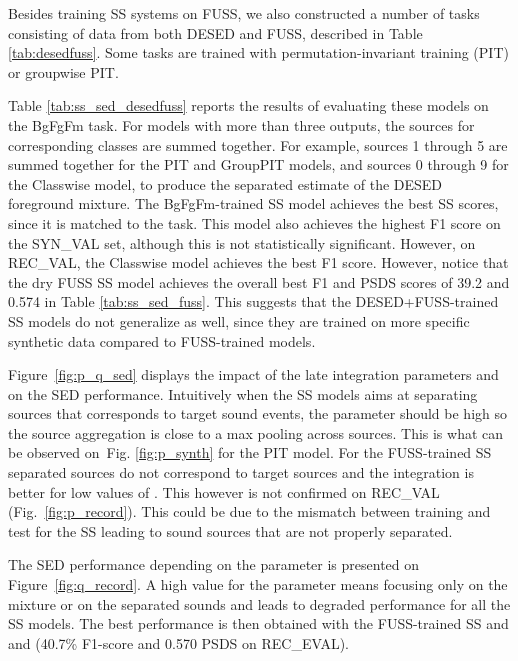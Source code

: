 \documentclass{article}
\begin{document}
\begin{sloppy}
Besides training SS systems on FUSS, we also constructed a number of tasks consisting of data from both DESED and FUSS, described in Table \ref{tab:desedfuss}. Some tasks are trained with permutation-invariant training (PIT) \cite{yu2017permutation} or groupwise PIT.



Table \ref{tab:ss_sed_desedfuss} reports the results of evaluating these models on the BgFgFm task. For models with more than three outputs, the sources for corresponding classes are summed together. For example, sources 1 through 5 are summed together for the PIT and GroupPIT models, and sources 0 through 9 for the Classwise model, to produce the separated estimate of the DESED foreground mixture. The BgFgFm-trained SS model achieves the best SS scores, since it is matched to the task. This model also achieves the highest F1 score on the SYN\_VAL set, although this is not statistically significant. However, on REC\_VAL, the Classwise model achieves the best F1 score. However, notice that the dry FUSS SS model achieves the overall best F1 and PSDS scores of 39.2 and 0.574 in Table \ref{tab:ss_sed_fuss}. This suggests that the DESED+FUSS-trained SS models do not generalize as well, since they are trained on more specific synthetic data compared to FUSS-trained models.

Figure~\ref{fig:p_q_sed} displays the impact of the late integration parameters  and  on the SED performance. Intuitively when the SS models aims at separating sources that corresponds to target sound events, the parameter  should be high so the source aggregation is close to a max pooling across sources. This is what can be observed on~Fig. \ref{fig:p_synth} for the PIT model. For the FUSS-trained SS separated sources do not correspond to target sources and the integration is better for low values of . This however is not confirmed on REC\_VAL (Fig.~\ref{fig:p_record}). This could be due to the mismatch between training and test for the SS leading to sound sources that are not properly separated.

The SED performance depending on the parameter  is presented on Figure~\ref{fig:q_record}. A high value for the parameter  means focusing only on the mixture or on the separated sounds and leads to degraded performance for all the SS models. The best performance is then obtained with the FUSS-trained SS and  and  (40.7\% F1-score and 0.570 PSDS on REC\_EVAL).













\end{sloppy}
\end{document}
